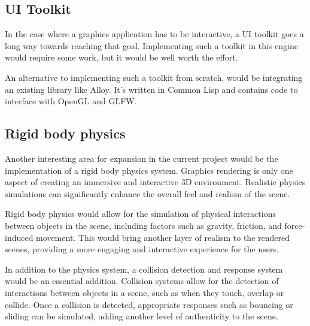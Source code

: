 \subsection{UI Toolkit}


In the case where a graphics application has to be interactive,
a UI toolkit goes a long way towards reaching that goal.
Implementing such a toolkit in this engine would require some work,
but it would be well worth the effort.

An alternative to implementing such a toolkit from scratch,
would be integrating an existing library like Alloy.
It's written in Common Lisp and contains code to interface with OpenGL and GLFW\cite{alloy}.



\subsection{Rigid body physics}

Another interesting area for expansion in the current project would be the implementation of a rigid body physics system.
Graphics rendering is only one aspect of creating an immersive and interactive 3D environment.
Realistic physics simulations can significantly enhance the overall feel and realism of the scene.

Rigid body physics would allow for the simulation of physical interactions between objects in the scene,
including factors such as gravity,
friction,
and force-induced movement.
This would bring another layer of realism to the rendered scenes,
providing a more engaging and interactive experience for the users.

In addition to the physics system,
a collision detection and response system would be an essential addition.
Collision systems allow for the detection of interactions between objects in a scene,
such as when they touch,
overlap or collide.
Once a collision is detected,
appropriate responses such as bouncing or sliding can be simulated,
adding another level of authenticity to the scene.

